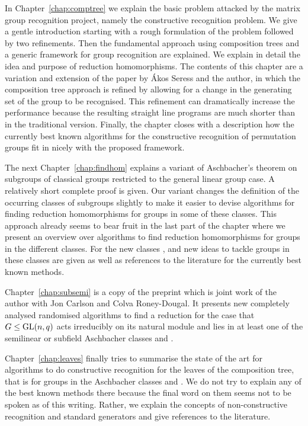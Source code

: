 In Chapter~\ref{chap:comptree} we explain the basic problem attacked
by the matrix group recognition project, namely the constructive
recognition problem. We give a gentle introduction starting with a
rough formulation of the problem followed by two refinements. Then the
fundamental approach using composition trees and a generic framework
for group recognition are explained. We explain in detail the idea and
purpose of reduction homomorphisms. The
contents of this chapter are a variation and extension of the paper
\cite{AkosMaxISSAC} by \'Akos Seress and the author, in which the
composition tree approach is refined by allowing for a change in the generating
set of the group to be recognised. This refinement can dramatically
increase the performance because the resulting straight line programs
are much shorter than in the traditional version. Finally, the chapter
closes with a description how the currently best known algorithms for
the constructive recognition of permutation groups fit in nicely with
the proposed framework.

The next Chapter~\ref{chap:findhom} explains a variant of Aschbacher's
theorem on subgroups of classical groups restricted to the general linear
group case. A relatively short complete proof is given.
Our variant changes the definition of the occurring
classes of subgroups slightly to make it easier to devise algorithms
for finding reduction homomorphisms for groups in some of these classes.
This approach already seems to bear fruit in the last part of the
chapter where we present an overview over algorithms to find reduction
homomorphisms for groups in the different classes. For the new classes
,  and  new ideas to tackle groups in these classes are
given as well as references to the literature for the currently best
known methods.

Chapter~\ref{chap:subsemi} is a copy of the preprint \cite{subfieldpaper}
which is joint work of the author with Jon Carlson and Colva
Roney-Dougal. It presents new completely analysed randomised algorithms
to find a reduction for the case that $G \le \GL(n,q)$ acts irreducibly
on its natural module and lies in at least one of the semilinear or
subfield Aschbacher classes  and .

Chapter~\ref{chap:leaves} finally tries to summarise the state of the
art for algorithms to do constructive recognition for the leaves of
the composition tree, that is for groups in the Aschbacher classes
 and . We do not try to explain any of the best known
methods there because the final word on them seems not to be spoken
as of this writing. Rather, we explain the concepts of non-constructive
recognition and standard generators and give references to the
literature.


